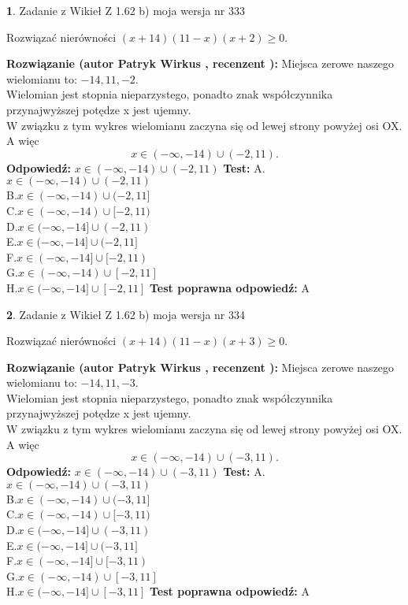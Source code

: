 \documentclass[12pt, a4paper]{article}
\theoremstyle{definition} %
\newtheorem{zad}{}
\newcommand{\zadStart}[1]{\begin{zad}#1\newline}
\newcommand{\zadStop}{\end{zad}}
\newcommand{\rozwStart}[2]{\noindent \textbf{Rozwiązanie (autor #1 , recenzent #2): }\newline}
\newcommand{\rozwStop}{\newline}
\newcommand{\odpStart}{\noindent \textbf{Odpowiedź:}\newline}
\newcommand{\odpStop}{\newline}
\newcommand{\testStart}{\noindent \textbf{Test:}\newline}
\newcommand{\testStop}{\newline}
\newcommand{\kluczStart}{\noindent \textbf{Test poprawna odpowiedź:}\newline}
\newcommand{\kluczStop}{\newline}
\begin{document}
\zadStart{Zadanie z Wikieł Z 1.62 b) moja wersja nr 333}

Rozwiązać nierówności $(x+14)(11-x)(x+2)\ge0$.
\zadStop
\rozwStart{Patryk Wirkus}{}
Miejsca zerowe naszego wielomianu to: $-14, 11, -2$.\\
Wielomian jest stopnia nieparzystego, ponadto znak współczynnika przy\linebreak najwyższej potędze x jest ujemny.\\ W związku z tym wykres wielomianu zaczyna się od lewej strony powyżej osi OX. A więc $$x \in (-\infty,-14) \cup (-2,11).$$
\rozwStop
\odpStart
$x \in (-\infty,-14) \cup (-2,11)$
\odpStop
\testStart
A.$x \in (-\infty,-14) \cup (-2,11)$\\
B.$x \in (-\infty,-14) \cup (-2,11]$\\
C.$x \in (-\infty,-14) \cup [-2,11)$\\
D.$x \in (-\infty,-14] \cup (-2,11)$\\
E.$x \in (-\infty,-14] \cup (-2,11]$\\
F.$x \in (-\infty,-14] \cup [-2,11)$\\
G.$x \in (-\infty,-14) \cup [-2,11]$\\
H.$x \in (-\infty,-14] \cup [-2,11]$
\testStop
\kluczStart
A
\kluczStop



\zadStart{Zadanie z Wikieł Z 1.62 b) moja wersja nr 334}

Rozwiązać nierówności $(x+14)(11-x)(x+3)\ge0$.
\zadStop
\rozwStart{Patryk Wirkus}{}
Miejsca zerowe naszego wielomianu to: $-14, 11, -3$.\\
Wielomian jest stopnia nieparzystego, ponadto znak współczynnika przy\linebreak najwyższej potędze x jest ujemny.\\ W związku z tym wykres wielomianu zaczyna się od lewej strony powyżej osi OX. A więc $$x \in (-\infty,-14) \cup (-3,11).$$
\rozwStop
\odpStart
$x \in (-\infty,-14) \cup (-3,11)$
\odpStop
\testStart
A.$x \in (-\infty,-14) \cup (-3,11)$\\
B.$x \in (-\infty,-14) \cup (-3,11]$\\
C.$x \in (-\infty,-14) \cup [-3,11)$\\
D.$x \in (-\infty,-14] \cup (-3,11)$\\
E.$x \in (-\infty,-14] \cup (-3,11]$\\
F.$x \in (-\infty,-14] \cup [-3,11)$\\
G.$x \in (-\infty,-14) \cup [-3,11]$\\
H.$x \in (-\infty,-14] \cup [-3,11]$
\testStop
\kluczStart
A
\kluczStop
\end{document}
